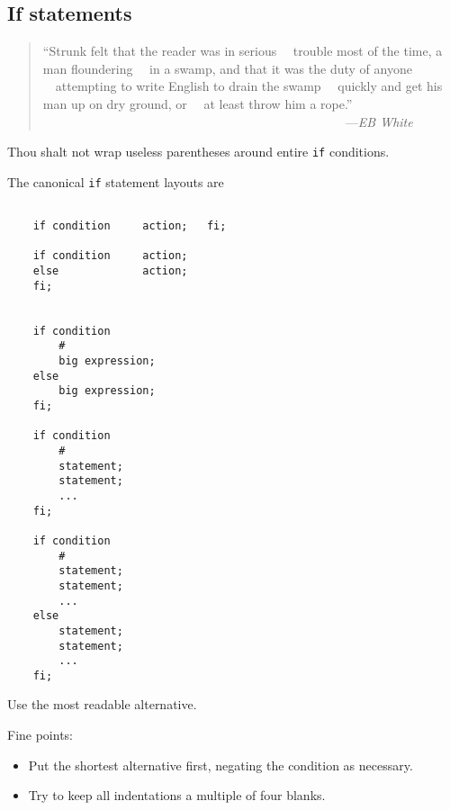 \subsection{If statements}

\begin{quote}\begin{tiny}
                 ``Strunk felt that the reader was in serious\newline
                 ~~trouble most of the time, a man floundering\newline
                 ~~in a swamp, and that it was the duty of anyone\newline
                 ~~attempting to write English to drain the swamp\newline
                 ~~quickly and get his man up on dry ground, or\newline
                 ~~at least throw him a rope.''\newline
\newline
               ~~~~~~~~~~~~~~~~~~~~~~~~~~~~~~~~~~~~~~~~~~~~~~~~---{\em EB White}
\end{tiny}\end{quote}

Thou shalt not wrap useless parentheses around entire {\tt if} conditions.

The canonical {\tt if} statement layouts are


\begin{verbatim}

    if condition     action;   fi;

    if condition     action;
    else             action;
    fi;


    if condition
        #
        big expression;
    else
        big expression;
    fi;

    if condition
        #
        statement;
        statement;
        ...
    fi;

    if condition
        #
        statement;
        statement;
        ...
    else
        statement;
        statement;
        ...
    fi;

\end{verbatim}

Use the most readable alternative.


Fine points:

\begin{itemize}
\item Put the shortest alternative first, negating the condition as necessary.
\item Try to keep all indentations a multiple of four blanks.
\end{itemize}


